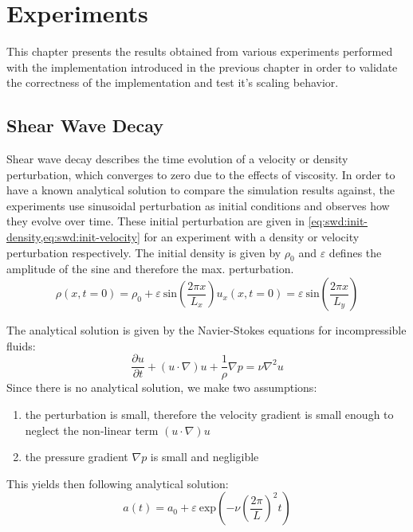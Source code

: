 \section{Experiments}

This chapter presents the results obtained from various experiments performed with the implementation introduced in the previous chapter in order to validate the correctness of the implementation and test it's scaling behavior.

\subsection{Shear Wave Decay}

Shear wave decay describes the time evolution of a velocity or density perturbation, which converges to zero due to the effects of viscosity. In order to have a known analytical solution to compare the simulation results against, the experiments use sinusoidal perturbation as initial conditions and observes how they evolve over time. These initial perturbation are given in \cref{eq:swd:init-density,eq:swd:init-velocity} for an experiment with a density or velocity perturbation respectively. The initial density is given by $\rho_0$ and $\varepsilon$ defines the amplitude of the sine and therefore the max. perturbation.
\begin{subequations}
    \begin{equation}
        \rho(x, t=0) = \rho_0 + \varepsilon~\text{sin}\left(\frac{2 \pi x}{L_x}\right)
        \label{eq:swd:init-density}
    \end{equation}
    \begin{equation}
        u_x(x, t=0) = \varepsilon~\text{sin}\left(\frac{2 \pi x}{L_y}\right)
        \label{eq:swd:init-velocity}
    \end{equation}
\end{subequations}

The analytical solution is given by the Navier-Stokes equations for incompressible fluids:
\begin{equation}
    \frac{\partial u}{\partial t} + (u\cdot\nabla)u + \frac{1}{\rho}\nabla p = \nu\nabla^2u
    \label{eq:swd:navier-stokes}
\end{equation}
Since there is no analytical solution, we make two assumptions:
\begin{enumerate}
    \item the perturbation is small, therefore the velocity gradient is small enough to neglect the non-linear term $(u\cdot\nabla)u$
    \item the pressure gradient $\nabla p$ is small and negligible
\end{enumerate}
This yields then following analytical solution:
\begin{equation}
    a(t) = a_0 + \varepsilon~\text{exp}\left(-\nu \left(\frac{2\pi}{L}\right)^2 t\right)
    \label{eq:swd:analytica-solution}
\end{equation}

